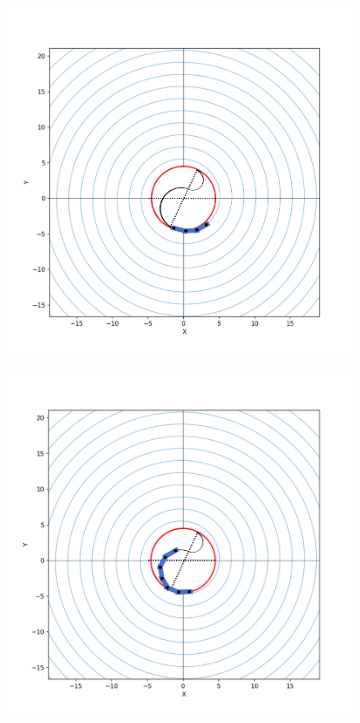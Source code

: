 \documentclass[withoutpreface,bwprint]{cumcmthesis}
\begin{document}
\begin{figure}[htbp!]
	\centering
	\begin{subfigure}[t]{0.32\textwidth}
		\includegraphics[width=\textwidth]{pics/sch1}
		\label{fig:s1}
	\end{subfigure}
	\hfill
	\begin{subfigure}[t]{0.32\textwidth}
		\includegraphics[width=\textwidth]{pics/sch2}

\end{subfigure}
\end{figure}
\end{document}
